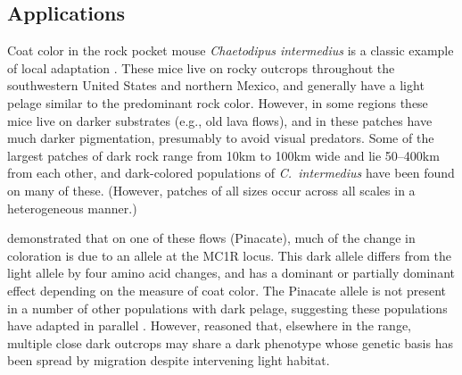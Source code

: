 \documentclass{article}
\newcommand{\revpoint}[2]{}
\newcommand{\citep}[1]{\cite{#1}}
\newcommand{\citet}[1]{\cite{#1}}
\begin{document}
\subsection{Applications} 
\label{ss:applications}
%
% 

Coat color in the rock pocket mouse
\emph{Chaetodipus intermedius} is a classic example of local
adaptation 
\citep{benson1933concealing,DiceBlossom1937}.
These mice live on rocky outcrops throughout the southwestern United States and northern Mexico, 
and generally have a light pelage similar to the predominant rock color.
However, in some regions these mice live on darker substrates (e.g., old lava flows),
and in these patches have much darker pigmentation, 
presumably to avoid visual predators.
Some of the largest patches of dark rock range from 10km to 100km wide
and lie 50--400km from each other,
and dark-colored populations of \emph{C.\ intermedius} have been found on many of these.
(However, patches of all sizes occur across all scales in a heterogeneous manner.)
\revpoint{2}{7}
\citet{nachman2003genetic} demonstrated that on one of these flows (Pinacate), 
much of the change in coloration is due to an allele at the MC1R locus.
This dark allele differs from the light allele by four amino acid changes, 
and has a dominant or partially dominant effect depending on the measure of coat color.
The Pinacate allele is not present in a number of other populations with dark pelage,
suggesting these populations have adapted in parallel \citep{nachman2003genetic,hoekstra2003different}.
However, \citet{hoekstra2004local} reasoned that, elsewhere in the range, 
multiple close dark outcrops may share a dark phenotype whose genetic basis has been spread by migration
despite intervening light habitat. 
\end{document}
